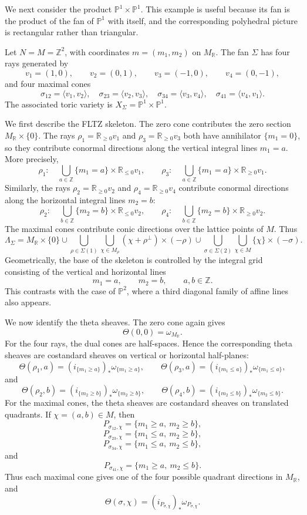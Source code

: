 We next consider the product \(\mathbb P^1\times\mathbb P^1\). This example is useful because its fan is the product of the fan of \(\mathbb P^1\) with itself, and the corresponding polyhedral picture is rectangular rather than triangular.

Let \(N=M=\mathbb Z^2\), with coordinates \(m=(m_1,m_2)\) on \(M_{\mathbb R}\). The fan \(\Sigma\) has four rays generated by
\[
v_1=(1,0),\qquad
v_2=(0,1),\qquad
v_3=(-1,0),\qquad
v_4=(0,-1),
\]
and four maximal cones
\[
\sigma_{12}=\langle v_1,v_2\rangle,\quad
\sigma_{23}=\langle v_2,v_3\rangle,\quad
\sigma_{34}=\langle v_3,v_4\rangle,\quad
\sigma_{41}=\langle v_4,v_1\rangle.
\]
The associated toric variety is \(X_\Sigma=\mathbb P^1\times\mathbb P^1\).

We first describe the FLTZ skeleton. The zero cone contributes the zero section \(M_{\mathbb R}\times\{0\}\). The rays \(\rho_1=\mathbb R_{\ge 0}v_1\) and \(\rho_3=\mathbb R_{\ge 0}v_3\) both have annihilator \(\{m_1=0\}\), so they contribute conormal directions along the vertical integral lines \(m_1=a\). More precisely,
\[
\rho_1:\quad
\bigcup_{a\in\mathbb Z}\{m_1=a\}\times\mathbb R_{\le 0}v_1,
\qquad
\rho_3:\quad
\bigcup_{a\in\mathbb Z}\{m_1=a\}\times\mathbb R_{\ge 0}v_1.
\]
Similarly, the rays \(\rho_2=\mathbb R_{\ge 0}v_2\) and \(\rho_4=\mathbb R_{\ge 0}v_4\) contribute conormal directions along the horizontal integral lines \(m_2=b\):
\[
\rho_2:\quad
\bigcup_{b\in\mathbb Z}\{m_2=b\}\times\mathbb R_{\le 0}v_2,
\qquad
\rho_4:\quad
\bigcup_{b\in\mathbb Z}\{m_2=b\}\times\mathbb R_{\ge 0}v_2.
\]
The maximal cones contribute conic directions over the lattice points of \(M\). Thus
\[
\Lambda_\Sigma
=
M_{\mathbb R}\times\{0\}
\cup
\bigcup_{\rho\in\Sigma(1)}
\bigcup_{\chi\in M_\rho}
(\chi+\rho^\perp)\times(-\rho)
\cup
\bigcup_{\sigma\in\Sigma(2)}
\bigcup_{\chi\in M}
\{\chi\}\times(-\sigma).
\]
Geometrically, the base of the skeleton is controlled by the integral grid consisting of the vertical and horizontal lines
\[
m_1=a,\qquad m_2=b,
\qquad a,b\in\mathbb Z.
\]
This contrasts with the case of \(\mathbb P^2\), where a third diagonal family of affine lines also appears.

We now identify the theta sheaves. The zero cone again gives
\[
\Theta(0,0)=\omega_{M_{\mathbb R}}.
\]
For the four rays, the dual cones are half-spaces. Hence the corresponding theta sheaves are costandard sheaves on vertical or horizontal half-planes:
\[
\Theta(\rho_1,a)
=
(i_{\{m_1\ge a\}})_*\omega_{\{m_1\ge a\}},
\qquad
\Theta(\rho_3,a)
=
(i_{\{m_1\le a\}})_*\omega_{\{m_1\le a\}},
\]
and
\[
\Theta(\rho_2,b)
=
(i_{\{m_2\ge b\}})_*\omega_{\{m_2\ge b\}},
\qquad
\Theta(\rho_4,b)
=
(i_{\{m_2\le b\}})_*\omega_{\{m_2\le b\}}.
\]
For the maximal cones, the theta sheaves are costandard sheaves on translated quadrants. If \(\chi=(a,b)\in M\), then
\[
P_{\sigma_{12},\chi}
=
\{m_1\ge a,\ m_2\ge b\},
\]
\[
P_{\sigma_{23},\chi}
=
\{m_1\le a,\ m_2\ge b\},
\]
\[
P_{\sigma_{34},\chi}
=
\{m_1\le a,\ m_2\le b\},
\]
and
\[
P_{\sigma_{41},\chi}
=
\{m_1\ge a,\ m_2\le b\}.
\]
Thus each maximal cone gives one of the four possible quadrant directions in \(M_{\mathbb R}\), and
\[
\Theta(\sigma,\chi)
=
(i_{P_{\sigma,\chi}})_*\omega_{P_{\sigma,\chi}}.
\]

